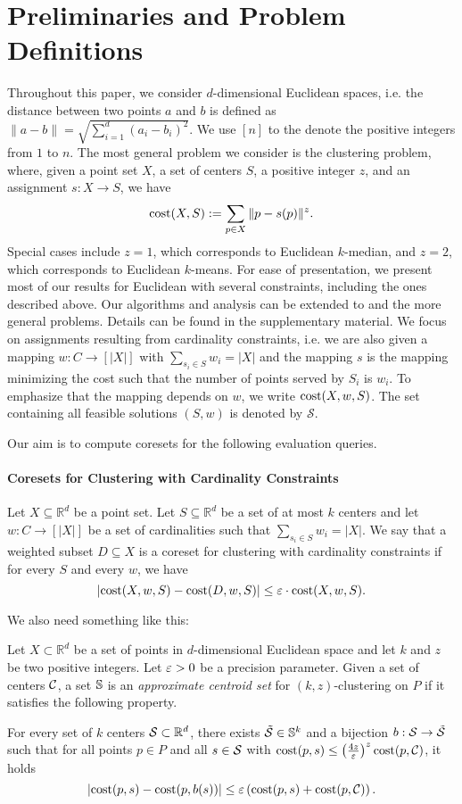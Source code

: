 \section{Preliminaries and Problem Definitions}

Throughout this paper, we consider $d$-dimensional Euclidean spaces, i.e. the distance between two points $a$ and $b$ is defined as $\|a-b\| = \sqrt{\sum_{i=1}^d (a_i-b_i)^2}$. We use $[n]$ to the denote the positive integers from $1$ to $n$.
The most general problem we consider is the \kzC clustering problem, where, given a point set $X$, a set of centers $S$, a positive integer $z$, and an assignment $s:X\rightarrow S$, we have
$$\text{cost}(X,S) := \sum_{p\in X} \|p-s(p)\|^z.$$
Special cases include $z=1$, which corresponds to Euclidean $k$-median, and $z=2$, which corresponds to Euclidean $k$-means.
For ease of presentation, we present most of our results for Euclidean \kMedian with several constraints, including the ones described above. Our algorithms and analysis can be extended to \kMeans and the more general \kzC problems. Details can be found in the supplementary material.
We focus on assignments resulting from cardinality constraints, i.e. we are also given a mapping $w:C\rightarrow [|X|]$ with $\sum_{s_i\in S} w_i = |X|$ and the mapping $s$ is the mapping minimizing the cost such that the number of points served by $S_i$ is $w_i$. To emphasize that the mapping depends on $w$, we write $\text{cost}(X,w,S)$.
The set containing all feasible solutions $(S,w)$ is denoted by $\mathcal{S}$.

Our aim is to compute coresets for the following evaluation queries.
\paragraph{Coresets for Clustering with Cardinality Constraints}
Let $X\subseteq \mathbb{R}^d$ be a point set. Let $S\subseteq \mathbb{R}^d$ be a set of at most $k$ centers and let $w:C\rightarrow [|X|]$ be a set of cardinalities such that $\sum_{s_i\in S} w_i = |X|$. We say that a weighted subset $D\subseteq X$ is a coreset for clustering with cardinality constraints if for every $S$ and every $w$, we have
$$ |\text{cost}(X,w,S) - \text{cost}(D,w,S)| \leq \varepsilon\cdot \text{cost}(X,w,S).$$

We also need something like this:

\begin{definition}\label{def:centroid-set}
Let $X\subset \mathbb{R}^d$ be a set of points in $d$-dimensional Euclidean space and let $k$ and $z$ be two positive integers. Let $\varepsilon > 0$ be a precision parameter. Given a set of centers $\mathcal{C}$, a set $\mathbb{S}$ is an \emph{approximate centroid set} for $(k, z)$-clustering on $P$ if it satisfies the following property.

For every set of $k$ centers $\mathcal{S} \subset \mathbb{R}^d$, there exists $\tilde {\mathcal{S}} \in \mathbb{S}^k$ and a bijection $b: \mathcal{S} \rightarrow \tilde {\mathcal{S}}$ such that for all points $p \in P$ and all $s\in \mathcal{S}$ with $\text{cost}(p, s) \leq \left(\frac{4z}{\varepsilon}\right)^z \text{cost}(p, \mathcal{C})$, it holds
\[|\text{cost}(p, s) - \text{cost}(p, b(s))| \leq \varepsilon \left(\text{cost}(p, s) + \text{cost}(p, \mathcal{C})\right).\] 
\end{definition}

